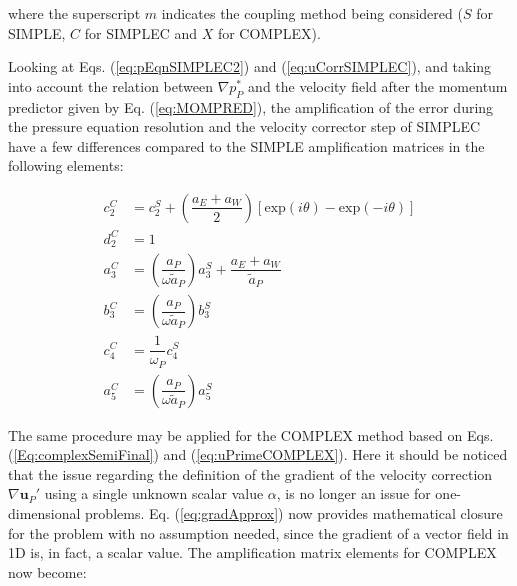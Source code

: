 \documentclass[final,3p,times,11pt,onecolumn]{myElsarticle}
\numberwithin{equation}{section}
\begin{document}
\noindent where the superscript $m$ indicates the coupling method being considered ($S$ for SIMPLE, $C$ for SIMPLEC and $X$ for COMPLEX).

Looking at Eqs. (\ref{eq:pEqnSIMPLEC2}) and (\ref{eq:uCorrSIMPLEC}), and taking into account the relation between $\nabla p_P^*$ and the velocity field after the momentum predictor given by Eq. (\ref{eq:MOMPRED}), the amplification of the error during the pressure equation resolution and the velocity corrector step of SIMPLEC have a few differences compared to the SIMPLE amplification matrices in the following elements:

\begin{equation}
\begin{split}
     c^C_2 &= c_2^S + \left(\dfrac{a_E + a_W}{2}\right) [\text{exp} (i    \theta) - \text{exp} (-i \theta)] \\
     d^C_2 &= 1 \\
     a^C_3 &= \left(\dfrac{a_P}{\omega \tilde{a}_P}\right) a_3^S + \dfrac{a_E+a_W}{\tilde{a}_P} \\
     b^C_3 &= \left(\dfrac{a_P}{\omega \tilde{a}_P}\right) b_3^S \\ 
     c^C_4 &= \dfrac{1}{\omega_P} c^S_4 \\
     a^C_5 &= \left(\dfrac{a_P}{\omega \tilde{a}_P}\right) a^S_5     
\end{split}
\end{equation}

The same procedure may be applied for the COMPLEX method based on Eqs. (\ref{Eq:complexSemiFinal}) and (\ref{eq:uPrimeCOMPLEX}). Here it should be noticed that the issue regarding the definition of the gradient of the velocity correction $\nabla \boldsymbol{u}_P'$ using a single unknown scalar value $\alpha$, is no longer an issue for one-dimensional problems. Eq. (\ref{eq:gradApprox}) now provides mathematical closure for the problem with no assumption needed, since the gradient of a vector field in 1D is, in fact, a scalar value. The amplification matrix elements for COMPLEX now become:
\end{document}
